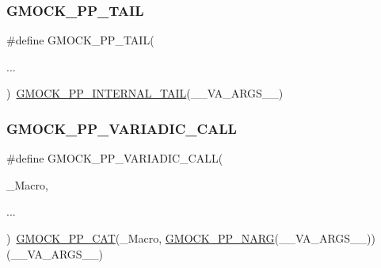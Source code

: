 \subsubsection{\texorpdfstring{GMOCK\_PP\_TAIL}{GMOCK\_PP\_TAIL}}
{\footnotesize\ttfamily \#define G\+M\+O\+C\+K\+\_\+\+P\+P\+\_\+\+T\+A\+IL(\begin{DoxyParamCaption}\item[{}]{... }\end{DoxyParamCaption})~\mbox{\hyperlink{_obj__test_2lib_2googletest-master_2googlemock_2include_2gmock_2internal_2gmock-pp_8h_a0e7741e9333e33780a56a8c5e2079942}{G\+M\+O\+C\+K\+\_\+\+P\+P\+\_\+\+I\+N\+T\+E\+R\+N\+A\+L\+\_\+\+T\+A\+IL}}(\+\_\+\+\_\+\+V\+A\+\_\+\+A\+R\+G\+S\+\_\+\+\_\+)}

\mbox{\label{googletest-master_2googlemock_2include_2gmock_2internal_2gmock-pp_8h_a4dd8715f753c7c3957f7185acf609e55}} 
\subsubsection{\texorpdfstring{GMOCK\_PP\_VARIADIC\_CALL}{GMOCK\_PP\_VARIADIC\_CALL}}
{\footnotesize\ttfamily \#define G\+M\+O\+C\+K\+\_\+\+P\+P\+\_\+\+V\+A\+R\+I\+A\+D\+I\+C\+\_\+\+C\+A\+LL(\begin{DoxyParamCaption}\item[{}]{\+\_\+\+Macro,  }\item[{}]{... }\end{DoxyParamCaption})~\mbox{\hyperlink{_obj__test_2lib_2googletest-master_2googlemock_2include_2gmock_2internal_2gmock-pp_8h_a108c52ffa81ab99348d23b8fa76fded3}{G\+M\+O\+C\+K\+\_\+\+P\+P\+\_\+\+C\+AT}}(\+\_\+\+Macro, \mbox{\hyperlink{_obj__test_2lib_2googletest-master_2googlemock_2include_2gmock_2internal_2gmock-pp_8h_a9db18220b88597a07704bc7cf3b13304}{G\+M\+O\+C\+K\+\_\+\+P\+P\+\_\+\+N\+A\+RG}}(\+\_\+\+\_\+\+V\+A\+\_\+\+A\+R\+G\+S\+\_\+\+\_\+))(\+\_\+\+\_\+\+V\+A\+\_\+\+A\+R\+G\+S\+\_\+\+\_\+)}

